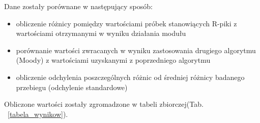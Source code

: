 		Dane zostały porównane w następujący sposób:
		\begin{itemize}
		\item obliczenie różnicy pomiędzy wartościami próbek stanowiących R-piki z wartościami                                   otrzymanymi w wyniku działania modułu
		\item porównanie wartości zwracanych w wyniku zastosowania drugiego algorytmu (Moody) z                               wartościami uzyskanymi z poprzedniego algorytmu
		\item obliczenie odchylenia poszczególnych różnic od średniej różnicy badanego przebiegu                          (odchylenie standardowe)
		\end{itemize}
	   
		Obliczone wartości zostały zgromadzone w tabeli zbiorczej(Tab. ~\ref{tabela_wynikow}). \newline
 
